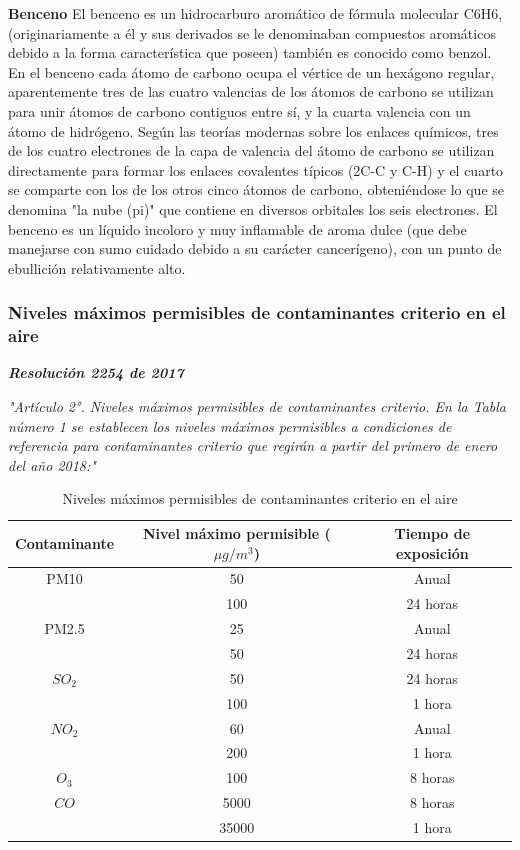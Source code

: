\textbf{Benceno}
El benceno es un hidrocarburo aromático de fórmula molecular C6H6, (originariamente a él y sus derivados se le denominaban compuestos aromáticos debido a la forma característica que poseen) también es conocido como benzol. En el benceno cada átomo de carbono ocupa el vértice de un hexágono regular, aparentemente tres de las cuatro valencias de los átomos de carbono se utilizan para unir átomos de carbono contiguos entre sí, y la cuarta valencia con un átomo de hidrógeno. Según las teorías modernas sobre los enlaces químicos, tres de los cuatro electrones de la capa de valencia del átomo de carbono se utilizan directamente para formar los enlaces covalentes típicos (2C-C y C-H) y el cuarto se comparte con los de los otros cinco átomos de carbono, obteniéndose lo que se denomina "la nube (pi)" que contiene en diversos orbitales los seis electrones. El benceno es un líquido incoloro y muy inflamable de aroma dulce (que debe manejarse con sumo cuidado debido a su carácter cancerígeno), con un punto de ebullición relativamente alto.

\subsubsection{Niveles máximos permisibles de contaminantes criterio en el aire}

\textbf{\textit{Resolución 2254 de 2017}}

\textit{"Artículo 2°. Niveles máximos permisibles de contaminantes criterio. En la Tabla número 1 se establecen los niveles máximos permisibles a condiciones de referencia para contaminantes criterio que regirán a partir del primero de enero del año 2018:"}

\begin{table}[h!]
	\begin{center}
		\begin{tabular}{| c | c | c |}
			\hline
			\rowcolor{lightgray}Contaminante 	& Nivel máximo permisible ($ \mu g/m^3 $) 	& Tiempo de exposición	\\ \hline
			PM10			& 50 		& Anual		\\
			  				& 100 		& 24 horas	\\ \hline
			PM2.5 			& 25 		& Anual 	\\
				 			& 50 		& 24 horas	\\ \hline
 			$ SO_2 $		& 50 		& 24 horas 	\\
 							& 100 		& 1 hora	\\ \hline
 			$ NO_2 $		& 60 		& Anual 	\\
 							& 200 		& 1 hora	\\ \hline
 			$ O_3 $			& 100 		& 8 horas 	\\ \hline
 			$ CO $			& 5000 		& 8 horas 	\\
 							& 35000 	& 1 hora	\\ \hline
		\end{tabular}
		\caption{Niveles máximos permisibles de contaminantes criterio en el aire}
	\end{center}
\end{table}

